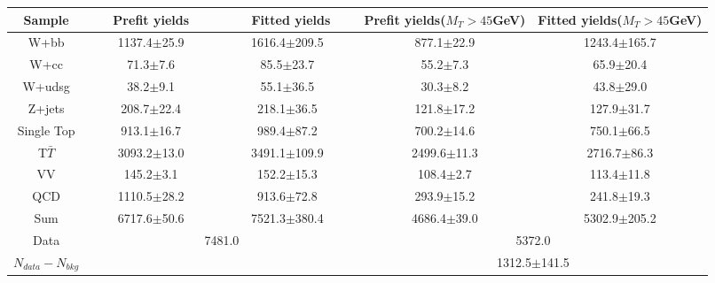  \begin{adjustbox}{width=\textwidth,center=\textwidth}
   \begin{tabular} {c|cc|cc} \hline\hline
			 Sample & ~~~Prefit yields~~~ & ~~~~Fitted yields~~~ & Prefit yields($M_T>45$GeV) & Fitted yields($M_T>45$GeV) \\ 
 \hline
W+bb&1137.4$\pm$25.9&1616.4$\pm$209.5&877.1$\pm$22.9&1243.4$\pm$165.7\\
W+cc&71.3$\pm$7.6&85.5$\pm$23.7&55.2$\pm$7.3&65.9$\pm$20.4\\
W+udsg&38.2$\pm$9.1&55.1$\pm$36.5&30.3$\pm$8.2&43.8$\pm$29.0\\
Z+jets&208.7$\pm$22.4&218.1$\pm$36.5&121.8$\pm$17.2&127.9$\pm$31.7\\
Single Top&913.1$\pm$16.7&989.4$\pm$87.2&700.2$\pm$14.6&750.1$\pm$66.5\\
T$\bar{T}$&3093.2$\pm$13.0&3491.1$\pm$109.9&2499.6$\pm$11.3&2716.7$\pm$86.3\\
VV&145.2$\pm$3.1&152.2$\pm$15.3&108.4$\pm$2.7&113.4$\pm$11.8\\
QCD&1110.5$\pm$28.2&913.6$\pm$72.8&293.9$\pm$15.2&241.8$\pm$19.3\\
\hline
Sum &6717.6$\pm$50.6&7521.3$\pm$380.4&4686.4$\pm$39.0&5302.9$\pm$205.2\\
\hline
Data&\multicolumn{2}{c}{7481.0}&\multicolumn{2}{c}{5372.0}\\
\hline
$N_{data}-N_{bkg}$&\multicolumn{2}{c}{}&\multicolumn{2}{c}{1312.5$\pm$141.5}\\
   \hline\hline
   \end{tabular}
 \end{adjustbox}
